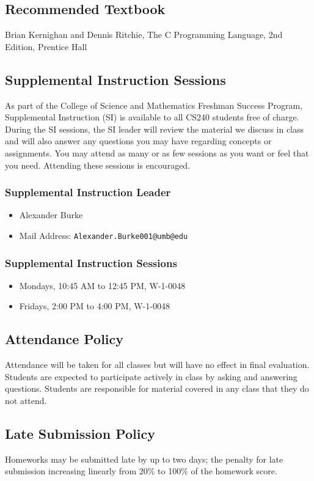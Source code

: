 \documentclass[12pt,letterpaper,twoside]{article}
\begin{document}
\subsection*{Recommended Textbook}
Brian Kernighan and Dennis Ritchie, The C Programming Language, 2nd Edition, Prentice Hall

\subsection*{Supplemental Instruction Sessions}
As part of the College of Science and Mathematics Freshman Success Program, Supplemental Instruction (SI) is available to all CS240 students free of charge.
During the SI sessions, the SI leader will review the material we discuss in class and will also answer any questions you may have regarding concepts or assignments.
You may attend as many or as few sessions as you want or feel that you need. Attending these sessions is encouraged.

\subsubsection*{Supplemental Instruction Leader}
\begin{itemize}
\item[] Alexander Burke
\item[] Mail Address: \texttt{Alexander.Burke001@umb@edu}
\end{itemize}

\subsubsection*{Supplemental Instruction Sessions}
\begin{itemize}
\item[] Mondays, 10:45 AM to 12:45 PM, W-1-0048
\item[] Fridays, 2:00 PM to 4:00 PM, W-1-0048
\end{itemize}

\subsection*{Attendance Policy}
Attendance will be taken for all classes but will have no effect in final evaluation.
Students are expected to participate actively in class by asking and answering questions.
Students are responsible for material covered in any class that they do not attend.

\subsection*{Late Submission Policy}
Homeworks may be submitted late by up to two days; the penalty for late submission increasing linearly from 20\% to 100\% of the homework score.
\end{document}
